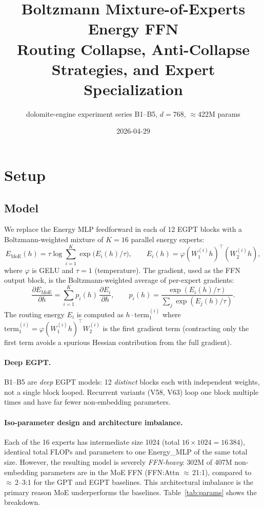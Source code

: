 \documentclass[11pt,a4paper]{article}
\title{\textbf{Boltzmann Mixture-of-Experts Energy FFN}\\
\large Routing Collapse, Anti-Collapse Strategies, and Expert Specialization}
\author{dolomite-engine experiment series B1--B5, $d{=}768$, ${\approx}422$M params}
\date{2026-04-29}
\begin{document}
\maketitle
\tableofcontents
\newpage

\section{Setup}

\subsection{Model}

We replace the Energy MLP feedforward in each of 12 EGPT blocks with a
Boltzmann-weighted mixture of $K{=}16$ parallel energy experts:
\begin{equation}
  E_\text{MoE}(h) = \tau \log \sum_{i=1}^{K} \exp\!\bigl(E_i(h)/\tau\bigr),
  \qquad
  E_i(h) = \varphi(W_1^{(i)}h)^\top (W_2^{(i)}h),
  \label{eq:energy}
\end{equation}
where $\varphi$ is GELU and $\tau{=}1$ (temperature).  The gradient, used as
the FFN output block, is the Boltzmann-weighted average of per-expert gradients:
\begin{equation}
  \frac{\partial E_\text{MoE}}{\partial h}
  = \sum_{i=1}^K p_i(h)\,\frac{\partial E_i}{\partial h},
  \qquad
  p_i(h) = \frac{\exp(E_i(h)/\tau)}{\sum_j \exp(E_j(h)/\tau)}.
  \label{eq:grad}
\end{equation}
The routing energy $E_i$ is computed as $h \cdot \text{term}_1^{(i)}$ where
$\text{term}_1^{(i)} = \varphi(W_1^{(i)}h)^\top W_2^{(i)}$ is the first
gradient term (contracting only the first term avoids a spurious Hessian
contribution from the full gradient).

\paragraph{Deep EGPT.}
B1--B5 are \emph{deep} EGPT models: 12 \emph{distinct} blocks each with
independent weights, not a single block looped.
Recurrent variants (V58, V63) loop one block multiple times and have far fewer
non-embedding parameters.

\paragraph{Iso-parameter design and architecture imbalance.}
Each of the 16 experts has intermediate size 1024 (total $16{\times}1024{=}16\,384$),
identical total FLOPs and parameters to one Energy\_MLP of the same total size.
However, the resulting model is severely \emph{FFN-heavy}: 302M of 407M
non-embedding parameters are in the MoE FFN (FFN:Attn $\approx$\,21:1),
compared to $\approx$\,2--3:1 for the GPT and EGPT baselines.
This architectural imbalance is the primary reason MoE underperforms the baselines.
Table~\ref{tab:params} shows the breakdown.
\end{document}
